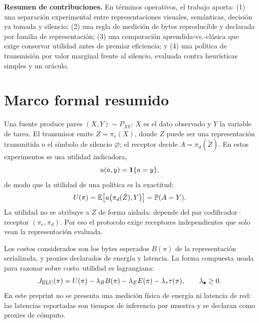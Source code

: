 \textbf{Resumen de contribuciones.} En t\'erminos operativos, el trabajo aporta: (1) una separaci\'on experimental entre representaciones visuales, sem\'anticas, decisi\'on ya tomada y silencio; (2) una regla de medici\'on de bytes reproducible y declarada por familia de representaci\'on; (3) una comparaci\'on aprendida-vs.-cl\'asica que exige conservar utilidad antes de premiar eficiencia; y (4) una pol\'itica de transmisi\'on por valor marginal frente al silencio, evaluada contra heur\'isticas simples y un or\'aculo.

\section{Marco formal resumido}

Una fuente produce pares $(X,Y)\sim P_{XY}$: $X$ es el dato observado y $Y$ la variable de tarea. El transmisor emite $Z=\pi_e(X)$, donde $Z$ puede ser una representaci\'on transmitida o el s\'imbolo de silencio $\varnothing$; el receptor decide $A=\pi_d(\tilde Z)$. En estos experimentos se usa utilidad indicadora,
\begin{equation}
 u(a,y)=\mathbf{1}\{a=y\},
\end{equation}
de modo que la utilidad de una pol\'itica es la exactitud:
\begin{equation}
 U(\pi)=\mathbb{E}\!\left[u\bigl(\pi_d(\tilde Z),Y\bigr)\right]=\mathbb{P}(A=Y).
\end{equation}
La utilidad no se atribuye a $Z$ de forma aislada: depende del par codificador--receptor $(\pi_e,\pi_d)$. Por eso el protocolo exige receptores independientes que solo vean la representaci\'on evaluada.

Los costos considerados son los bytes esperados $B(\pi)$ de la representaci\'on serializada, y proxies declarados de energ\'ia y latencia. La forma compuesta usada para razonar sobre costo--utilidad es lagrangiana:
\begin{equation}
J_{\mathrm{ELU}}(\pi)=U(\pi)-\lambda_B B(\pi)-\lambda_E E(\pi)-\lambda_\tau \tau(\pi),\qquad \lambda_\bullet\ge 0.
\end{equation}
En este preprint no se presenta una medici\'on f\'isica de energ\'ia ni latencia de red: las latencias reportadas son tiempos de inferencia por muestra y se declaran como proxies de c\'omputo.

